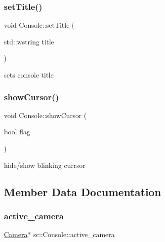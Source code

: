 \mbox{\label{classsc_1_1_console_a9ac084f4c300b486eafe2ef98c812e4f}} 
\subsubsection{\texorpdfstring{setTitle()}{setTitle()}}
{\footnotesize\ttfamily void Console\+::set\+Title (\begin{DoxyParamCaption}\item[{std\+::wstring}]{title }\end{DoxyParamCaption})}



sets console title 

\mbox{\label{classsc_1_1_console_abcbb6154c7265d8a31b46338faa4ea8f}} 
\subsubsection{\texorpdfstring{showCursor()}{showCursor()}}
{\footnotesize\ttfamily void Console\+::show\+Cursor (\begin{DoxyParamCaption}\item[{bool}]{flag }\end{DoxyParamCaption})}



hide/show blinking currsor 



\subsection{Member Data Documentation}
\mbox{\label{classsc_1_1_console_a6c65d539f04b9463516e74ecc75a5fcd}} 
\subsubsection{\texorpdfstring{active\_camera}{active\_camera}}
{\footnotesize\ttfamily \mbox{\hyperlink{classsc_1_1_camera}{Camera}}$\ast$ sc\+::\+Console\+::active\+\_\+camera}

